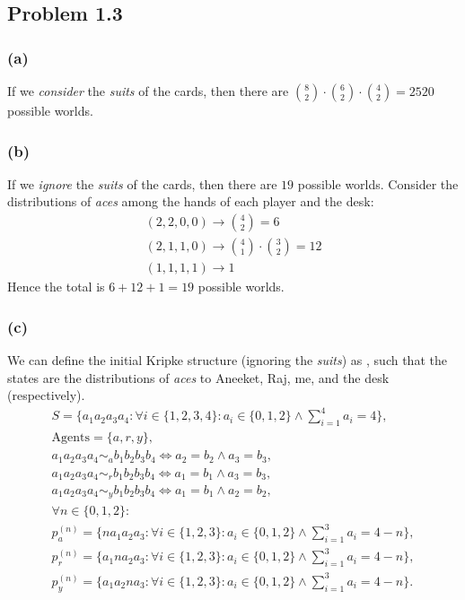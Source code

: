 \subsection*{Problem 1.3}

\subsubsection*{(a)}
If we \emph{consider} the \emph{suits} of the cards,
then there are $\binom{8}{2}\cdot\binom{6}{2}
\cdot\binom{4}{2} = 2520$ possible worlds.

\subsubsection*{(b)}
If we \emph{ignore} the \emph{suits} of the cards,
then there are $19$ possible worlds.
Consider the distributions of \emph{aces}
among the hands of each player and the desk:
\begin{gather*}
    (2,2,0,0) \rightarrow \binom{4}{2} = 6 \\
    (2,1,1,0) \rightarrow \binom{4}{1}\cdot\binom{3}{2} = 12 \\
    (1,1,1,1) \rightarrow 1
\end{gather*}
Hence the total is $6+12+1 = 19$ possible worlds.

\subsubsection*{(c)}
We can define the initial Kripke structure
(ignoring the \emph{suits}) as \krip{},
such that the states are the distributions of
\emph{aces} to Aneeket, Raj, me, and the desk
(respectively).
\begin{gather*}
    S = \{ a_1a_2a_3a_4 : 
        \forall i \in \{1,2,3,4\}:
            a_i \in \{0,1,2\}
            \land \sum_{i=1}^{4} a_i = 4
        \}, \\
    \text{Agents} = \{a,r,y\}, \\
    a_1a_2a_3a_4 \sim_{a} b_1b_2b_3b_4 
        \iff a_2 = b_2 \land a_3 = b_3, \\
    a_1a_2a_3a_4 \sim_{r} b_1b_2b_3b_4 
        \iff a_1 = b_1 \land a_3 = b_3, \\
    a_1a_2a_3a_4 \sim_{y} b_1b_2b_3b_4 
        \iff a_1 = b_1 \land a_2 = b_2,
    \tag{1.3(c1)}\label{eq:1.3(c1)} \\
    \forall n \in \{0,1,2\}: \\
    p_{a}^{(n)} = \{ n a_1 a_2 a_3 : 
        \forall i \in \{1,2,3\}: 
            a_i \in \{0,1,2\}
            \land \sum_{i=1}^{3} a_i = 4-n \}, \\
    p_{r}^{(n)} = \{ a_1 n a_2 a_3 : 
        \forall i \in \{1,2,3\}: 
            a_i \in \{0,1,2\}
            \land \sum_{i=1}^{3} a_i = 4-n \}, \\
    p_{y}^{(n)} = \{ a_1 a_2 n a_3 : 
        \forall i \in \{1,2,3\}: 
            a_i \in \{0,1,2\}
            \land \sum_{i=1}^{3} a_i = 4-n \}.
\end{gather*}

